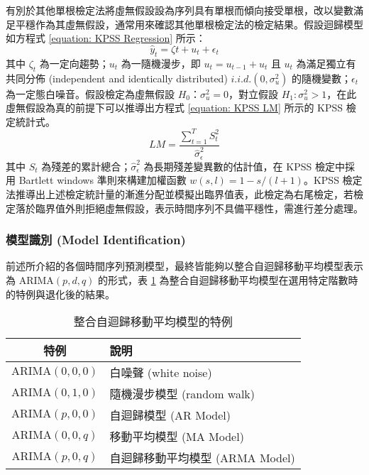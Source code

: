 有別於其他單根檢定法將虛無假設設為序列具有單根而傾向接受單根，改以變數滿足平穩作為其虛無假設，通常用來確認其他單根檢定法的檢定結果。假設迴歸模型如方程式 \eqref{equation: KPSS Regression} 所示：
%
\begin{equation}\label{equation: KPSS Regression}
  \hat{y}_{t} = \zeta t + u_{t}  + \epsilon_{t}
\end{equation}
%
其中 $\zeta_t$ 為一定向趨勢；$u_{t}$ 為一隨機漫步，即 $u_{t} = u_{t-1} + u_{t}$ 且 $u_t$ 為滿足獨立有共同分佈 (independent and identically distributed)  $i.i.d. (0, \sigma_{u}^{2})$ 的隨機變數；$\epsilon_{t}$ 為一定態白噪音。假設檢定為虛無假設 $H_0$：$\sigma_{u}^{2} = 0$，對立假設 $H_1: \sigma_{u}^{2} > 1$，在此虛無假設為真的前提下可以推導出方程式 \eqref{equation: KPSS LM} 所示的 KPSS 檢定統計式。
%
\begin{equation}\label{equation: KPSS LM}
  LM = \frac{\sum_{t = 1}^{T} S_{t}^{2}}{\hat{\sigma}_{\epsilon}^{2}}
\end{equation}
%
其中 $S_t$ 為殘差的累計總合；$\hat{\sigma}_{\epsilon}^{2}$ 為長期殘差變異數的估計值，在 KPSS 檢定中採用 Bartlett windows 準則來構建加權函數 $w(s, l) = 1 - s/(l + 1)$。KPSS 檢定法推導出上述檢定統計量的漸進分配並模擬出臨界值表，此檢定為右尾檢定，若檢定落於臨界值外則拒絕虛無假設，表示時間序列不具備平穩性，需進行差分處理。

\subsubsection{模型識別 (Model Identification)}

前述所介紹的各個時間序列預測模型，最終皆能夠以整合自迴歸移動平均模型表示為 $\text{ARIMA}(p, d, q)$ 的形式，表 \ref{table: Special Case of ARIMA(p, q, r)} 為整合自迴歸移動平均模型在選用特定階數時的特例與退化後的結果。

\begin{table}[htbp]
  \centering
  \caption[整合自迴歸移動平均模型的特例]{整合自迴歸移動平均模型的特例}
  \begin{tabular*}{\textwidth}{cl}
    \toprule
    \textbf{特例}           & \textbf{說明} \\
    \midrule
    $\text{ARIMA}(0, 0, 0)$ & 白噪聲 (white noise)  \\
    $\text{ARIMA}(0, 1, 0)$ & 隨機漫步模型 (random walk)  \\
    $\text{ARIMA}(p, 0, 0)$ & 自迴歸模型 (AR Model)  \\
    $\text{ARIMA}(0, 0, q)$ & 移動平均模型 (MA Model)  \\
    $\text{ARIMA}(p, 0, q)$ & 自迴歸移動平均模型 (ARMA Model)  \\
    \bottomrule
  \end{tabular*}
  \label{table: Special Case of ARIMA(p, q, r)}
\end{table}

